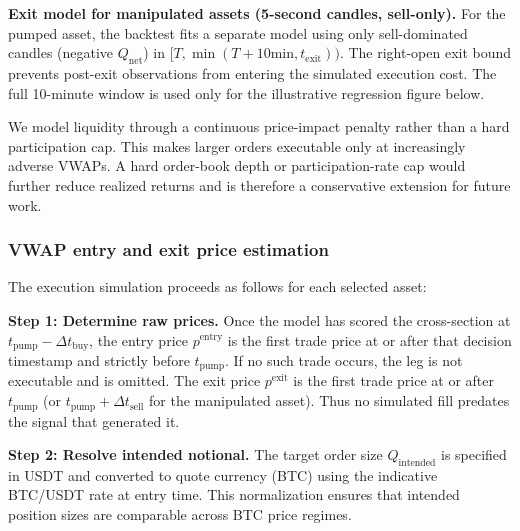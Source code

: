 \documentclass{ieeeaccess}
\begin{document}
\textbf{Exit model for manipulated assets (5-second candles, sell-only).} For the pumped asset, the backtest fits a separate model using only sell-dominated candles (negative $Q_{\mathrm{net}}$) in $[T,\min(T+10\mathrm{min},t_{\mathrm{exit}}))$. The right-open exit bound prevents post-exit observations from entering the simulated execution cost. The full 10-minute window is used only for the illustrative regression figure below.

We model liquidity through a continuous price-impact penalty rather than a hard participation cap. This makes larger orders executable only at increasingly adverse VWAPs. A hard order-book depth or participation-rate cap would further reduce realized returns and is therefore a conservative extension for future work.

\subsubsection{VWAP entry and exit price estimation}
\label{sec:vwap_estimation}

The execution simulation proceeds as follows for each selected asset:

\textbf{Step 1: Determine raw prices.} Once the model has scored the cross-section at $t_{\mathrm{pump}} - \Delta t_{\mathrm{buy}}$, the entry price $p^{\mathrm{entry}}$ is the first trade price at or after that decision timestamp and strictly before $t_{\mathrm{pump}}$. If no such trade occurs, the leg is not executable and is omitted. The exit price $p^{\mathrm{exit}}$ is the first trade price at or after $t_{\mathrm{pump}}$ (or $t_{\mathrm{pump}} + \Delta t_{\mathrm{sell}}$ for the manipulated asset). Thus no simulated fill predates the signal that generated it.

\textbf{Step 2: Resolve intended notional.} The target order size $Q_{\mathrm{intended}}$ is specified in USDT and converted to quote currency (BTC) using the indicative BTC/USDT rate at entry time. This normalization ensures that intended position sizes are comparable across BTC price regimes.
\end{document}
